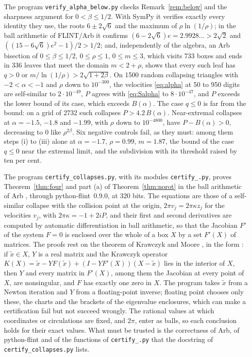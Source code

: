 \documentclass[11pt]{article}
\theoremstyle{definition}
\begin{document}
The program \texttt{verify\_\allowbreak alpha\_\allowbreak below.py} checks Remark~\ref{rem:below} and the sharpness argument for $0 < \beta \le 1/2$. With SymPy it verifies exactly every identity they use, the roots $6 \pm 2\sqrt6$ and the maximum of $\rho\ln(1/\rho)$; in the ball arithmetic of FLINT/Arb it confirms $(6 - 2\sqrt6)e = 2.9928\ldots > 2\sqrt2$ and $((15 - 6\sqrt6)e^2 - 1)/2 > 1/2$; and, independently of the algebra, an Arb bisection of $0 \le \beta \le 1/2$, $0 \le \rho \le 1$, $0 \le m \le 3$, which visits 733 boxes and ends in 336 leaves that meet the domain $m < 2 + \rho$, shows that every such leaf has $q > 0$ or $m/\ln(1/\rho) > 2\sqrt{1 + 2\beta}$. On 1500 random collapsing triangles with $-2 < \alpha < -1$ and $\rho$ down to $10^{-300}$, the velocities \eqref{eq:alpha} at 50 to 950 digits are self-similar to $2 \cdot 10^{-49}$, $P$ agrees with \eqref{eq:Salpha} to $8 \cdot 10^{-47}$, and $P$ exceeds the lower bound of its case, which exceeds $B(\alpha)$. The case $q \le 0$ is far from the bound: on a grid of 2732 such collapses $P > 4.2\,B(\alpha)$. Near-extremal collapses at $\alpha = -1.5$, $-1.8$ and $-1.99$, with $\rho$ down to $10^{-4800}$, have $P - B(\alpha) > 0$, decreasing to $0$ like $\rho^{2\beta}$. Six negative controls fail, as they must: among them steps (i) to (iii) alone at $\alpha = -1.7$, $\rho = 0.99$, $m = 1.87$, the bound of the case $q \le 0$ near the extremal limit, and the subdivision with its threshold raised by ten per cent.

The program \texttt{certify\_\allowbreak collapses.py}, with its modules \texttt{certify\_\allowbreak *.py}, proves Theorem~\ref{thm:four} and part (a) of Theorem~\ref{thm:norot} in the ball arithmetic of Arb \cite{johansson2017}, through python-flint~0.9.0, at 320 bits. The equations are those of a self-similar collapse with the collision point at the origin, $2\pi v_j = 2\pi\kappa z_j$ for the velocities $v_j$, with $2\pi\kappa = -1 + 2iP$, and their first and second derivatives are computed by automatic differentiation in ball arithmetic, so that the Jacobian $F'$ of the system $F = 0$ is enclosed over the whole of a box $X$ by a set $F'(X)$ of matrices. The proofs rest on the theorem of Krawczyk and Moore \cite{krawczyk1969,moore1977}, in the form \cite[Theorem~13.3]{rump2010}: if $\tilde x \in X$, $Y$ is a real matrix and the Krawczyk operator $K(X) = \tilde x - YF(\tilde x) + (I - YF'(X))(X - \tilde x)$ lies in the interior of $X$, then $Y$ and every matrix in $F'(X)$, among them the Jacobian at every point of $X$, are nonsingular, and $F$ has exactly one zero in $X$. The program takes $\tilde x$ from a Newton iteration and $Y$ from a floating-point inverse; floating point chooses only these, the charts and the brackets of the eigenvalue enclosures, which can make a certification fail but not succeed wrongly. The rational values at which coordinates or circulations are fixed, and $2\pi$, enter as balls, so each conclusion holds for their exact values. What must be trusted is the correctness of Arb, of python-flint and of the functions of \texttt{certify\_\allowbreak *.py} that the docstring of \texttt{certify\_\allowbreak collapses.py} lists.
\end{document}
